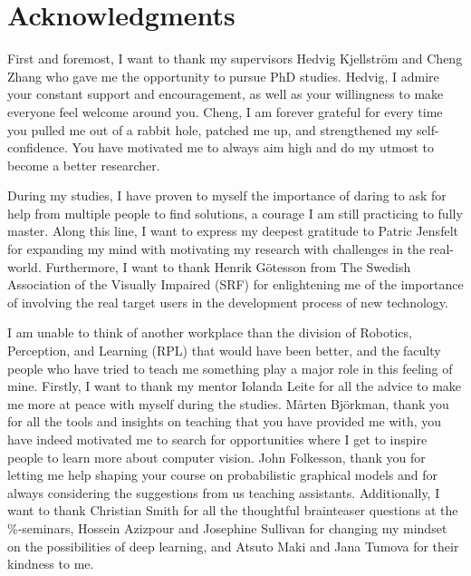 
\chapter{Acknowledgments}
\label{chap:acknowledgements}

\noindent First and foremost, I want to thank my supervisors Hedvig Kjellström and Cheng Zhang who gave me the opportunity to pursue PhD studies. Hedvig, I admire your constant support and encouragement, as well as your willingness to make everyone feel welcome around you. Cheng, I am forever grateful for every time you pulled me out of a rabbit hole, patched me up, and strengthened my self-confidence. You have motivated me to always aim high and do my utmost to become a better researcher. 
\newline

\noindent 
During my studies, I have proven to myself the importance of daring to ask for help from multiple people to find solutions, a courage I am still practicing to fully master. Along this line, I want to express my deepest gratitude to Patric Jensfelt for expanding my mind with motivating my research with challenges in the real-world.
Furthermore, I want to thank Henrik Götesson from The Swedish Association of the Visually Impaired (SRF) for enlightening me of the importance of involving the real target users in the development process of new technology. 
\newline 

 
\noindent 
I am unable to think of another workplace than the division of Robotics, Perception, and Learning (RPL) that would have been better, and the faculty people who have tried to teach me something play a major role in this feeling of mine. 
Firstly, I want to thank my mentor Iolanda Leite for all the advice to make me more at peace with myself during the studies. 
Mårten Björkman, thank you for all the tools and insights on teaching that you have provided me with, you have indeed motivated me to search for opportunities where I get to inspire people to learn more about computer vision. 
John Folkesson, thank you for letting me help shaping your course on probabilistic graphical models and for always considering the suggestions from us teaching assistants. Additionally, I want to thank 
Christian Smith for all the thoughtful brainteaser questions at the \%-seminars, 
Hossein Azizpour and Josephine Sullivan for changing my mindset on the possibilities of deep learning, 
and Atsuto Maki and Jana Tumova for their kindness to me.  
\newline 


